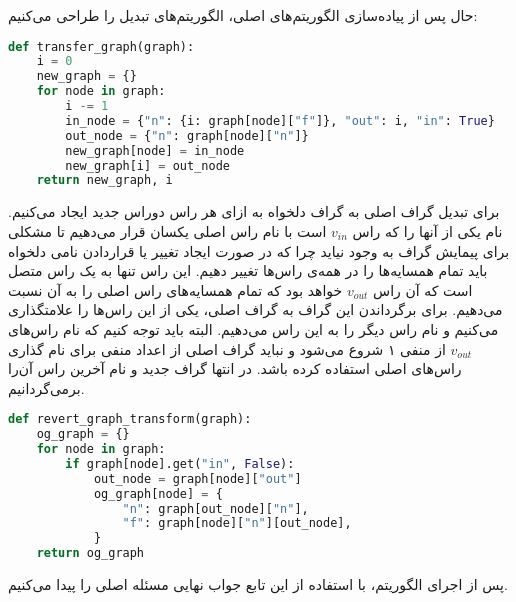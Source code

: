 \documentclass[]{article}
\begin{document}
حال پس از پیاده‌سازی الگوریتم‌های اصلی، الگوریتم‌های تبدیل را طراحی می‌کنیم:
\begin{latin}
\begin{lstlisting}[language=python]
def transfer_graph(graph):
    i = 0
    new_graph = {}
    for node in graph:
        i -= 1
        in_node = {"n": {i: graph[node]["f"]}, "out": i, "in": True}
        out_node = {"n": graph[node]["n"]}
        new_graph[node] = in_node
        new_graph[i] = out_node
    return new_graph, i
\end{lstlisting}
\end{latin}
برای تبدیل گراف اصلی به گراف دلخواه به ازای هر راس دوراس جدید ایجاد می‌کنیم.
نام یکی از آنها را که راس $v_{in}$ است با نام راس اصلی یکسان قرار می‌دهیم
تا مشکلی برای پیمایش گراف به وجود نیاید چرا که در صورت ایجاد تغییر یا قراردادن نامی دلخواه
باید تمام همسایه‌ها را در همه‌ی راس‌ها تغییر دهیم. این راس تنها به یک راس متصل است
که آن راس $v_{out}$ خواهد بود که تمام همسایه‌های راس اصلی را به آن نسبت می‌دهیم.
برای برگرداندن این گراف به گراف اصلی، یکی از این راس‌ها را علامتگذاری می‌کنیم و نام راس دیگر را
به این راس می‌دهیم. البته باید توجه کنیم که نام راس‌های $v_{out}$ از منفی ۱ شروع می‌شود و
نباید گراف اصلی از اعداد منفی برای نام گذاری راس‌های اصلی استفاده کرده باشد.
در انتها گراف جدید و نام آخرین راس آن‌را برمی‌گردانیم.
\begin{latin}
\begin{lstlisting}[language=python]
def revert_graph_transform(graph):
    og_graph = {}
    for node in graph:
        if graph[node].get("in", False):
            out_node = graph[node]["out"]
            og_graph[node] = {
                "n": graph[out_node]["n"],
                "f": graph[node]["n"][out_node],
            }
    return og_graph
\end{lstlisting}
\end{latin}
پس از اجرای الگوریتم، با استفاده از این تابع جواب نهایی مسئله اصلی را پیدا می‌کنیم.
\end{document}
